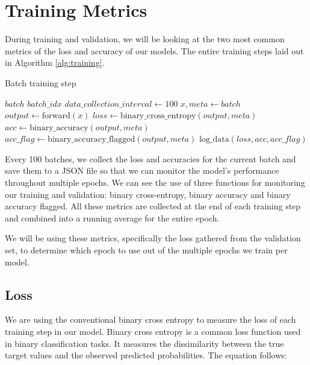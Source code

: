 \section{Training Metrics}

During training and validation, we will be looking at the two most common metrics of the loss and accuracy of our models. The entire training steps laid out in Algorithm \ref{alg:training}.

\begin{algorithm}[H]
    \caption{Batch training step}
    \begin{algorithmic}[1]
        \Require $batch$
        \Require $batch\_idx$
        \State $data\_collection\_interval \gets 100$
        \State $x, meta \gets batch$
        \State $output \gets \text{forward}(x)$
        \State $loss \gets \text{binary\_cross\_entropy}(output, meta)$
        \State $acc \gets \text{binary\_accuracy}(output, meta)$
        \State $acc\_flag \gets \text{binary\_accuracy\_flagged}(output, meta)$
        \State $\text{log\_data}(loss, acc, acc\_flag)$
        \EndIf
    \end{algorithmic}
    \label{alg:training}
\end{algorithm}

Every 100 batches, we collect the loss and accuracies for the current batch and save them to a JSON file so that we can monitor the model's performance throughout multiple epochs. We can see the use of three functions for monitoring our training and validation: binary cross-entropy, binary accuracy and binary accuracy flagged. All these metrics are collected at the end of each training step and combined into a running average for the entire epoch.

We will be using these metrics, specifically the loss gathered from the validation set, to determine which epoch to use out of the multiple epochs we train per model.

\subsection{Loss}

We are using the conventional binary cross entropy to measure the loss of each training step in our model. Binary cross entropy is a common loss function used in binary classification tasks. It measures the dissimilarity between the true target values and the observed predicted probabilities. The equation follows:

